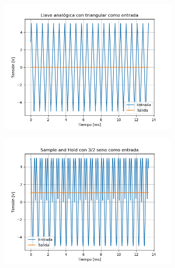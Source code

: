 \begin{figure}[H]
	\begin{subfigure}{.5\textwidth}
	\centering
	\includegraphics[width=\textwidth]{ImagenesEjercicio6/puntob2/LA - Tri.png}
	\end{subfigure}
	\begin{subfigure}{.5\textwidth}
	\centering
	\includegraphics[width=\textwidth]{ImagenesEjercicio6/puntob2/SH - 3 2.png}
	\end{subfigure}
	

\end{figure}

